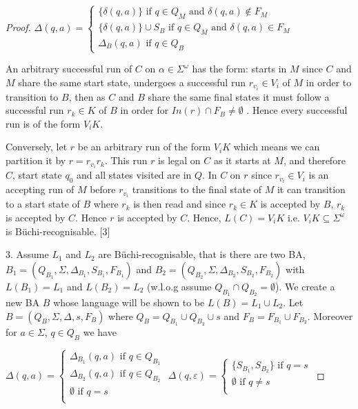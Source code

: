 \documentclass[a4paper,12pt]{report}
\theoremstyle{definition}
\begin{document}
\begin{proof}
$\Delta(q,a) =
\begin{cases}
\{\delta(q,a)\} \text{ if } q\in Q_M\text{ and } \delta(q,a)\notin F_M\\
\{\delta(q,a)\}\cup S_B \text{ if } q\in Q_M \text{ and } \delta(q,a)\in F_M \\
\Delta_B(q,a) \text{ if } q\in Q_B
\end{cases}$

An arbitrary successful run of $C$ on $\alpha\in\Sigma^\omega$ has the form: starts in $M$ since $C$ and $M$ share the same start state, undergoes a successful run $r_{v_i }\in V_i$ of $M$ in order to transition to $B$, then 
as $C$ and $B$ share the same final states it must follow a successful run $r_k\in K$ of $B$ in order for $In(r) \cap F_B\neq\emptyset$ . Hence every successful run is of the form $V_iK$. 

Conversely, let $r$ be an arbitrary run of the form $V_iK$ which means we can partition it by $r=r_{v_i}r_{k}$. This run $r$ is legal on $C$ as it starts at $M$, and therefore $C$, start state $q_0$ and all states visited are in $Q$. In $C$ on $r$ since $r_{v_i}\in V_i$ is an accepting run of $M$ before $r_{v_i}$ transitions to the final state of $M$ it can transition to a start state of $B$ where $r_k$ is then read and since $r_k\in K$ is accepted by $B$, $r_k$ is accepted by $C$. Hence $r$ is accepted by $C$. Hence, $L(C)=V_iK$  i.e. $V_iK\subseteq \Sigma^\omega$ is Büchi-recognisable. 
[3]

3. Assume $L_1$ and $L_2$ are Büchi-recognisable, that is there are two BA, $B_1=(Q_{B_1},\Sigma,\Delta_{B_1},S_{B_1},F_{B_1})$ and $B_2=(Q_{B_2},\Sigma,\Delta_{B_2}, S_{B_2}, F_{B_2})$ with $L(B_1)=L_1$ and $L(B_2)=L_2$ (w.l.o.g assume $Q_{B_1} \cap Q_{B_2}=\emptyset$). We create a new BA $B$ whose language will be shown to be $L(B)=L_1\cup L_2$. Let $B=(Q_B, \Sigma, \Delta, s,  F_B)$ where $Q_B=Q_{B_1}\cup Q_{B_2}\cup s$ and $F_B=F_{B_1}\cup F_{B_2}$. Moreover for  $a\in\Sigma$, $q\in Q_B$ we have

 
$\Delta(q,a) = 
\begin{cases}
 \Delta_{B_1}(q,a) \text{ if } q\in Q_{B_1}\\
 \Delta_{B_2}(q,a) \text{ if } q\in Q_{B_2} \\
 \emptyset \text{ if } q=s \\
\end{cases}$
$\Delta(q,\varepsilon) = 
\begin{cases}
\{ S_{B_1}, S_{B_2} \}\text{ if } q= s\\
\emptyset \text{ if } q\neq s \\
\end{cases}
$


\end{proof}
\end{document}
